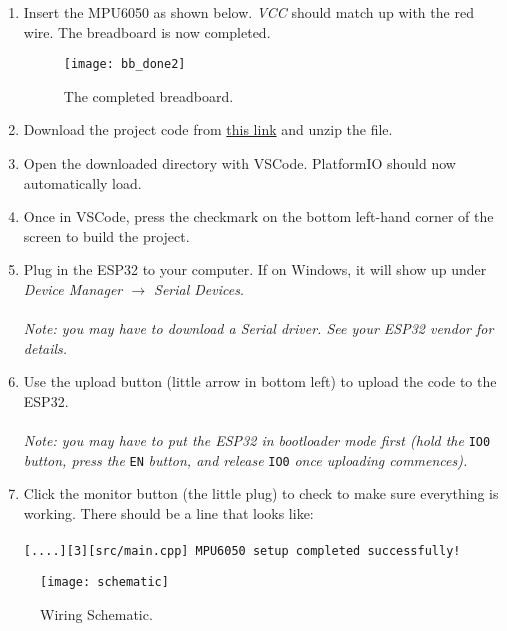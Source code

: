 \begin{enumerate}
\item Insert the MPU6050 as shown below. \textit{VCC} should match up with the
  red wire. The breadboard is now completed.
  \begin{figure}[H]
    \centering
    \texttt{[image: bb\_done2]}
    \caption[Completed breadboard]{The completed breadboard.}
  \end{figure}
  
\item Download the project code
  from
  \href{https://github.com/MrAwesomeRocks/dtc-head-tracker/archive/refs/heads/master.zip}{this
    link} and unzip the file.
  
\item Open the downloaded directory with VSCode. PlatformIO should now
  automatically load.
  
\item Once in VSCode, press the checkmark on the bottom left-hand corner of the
  screen to build the project.
  
\item Plug in the ESP32 to your computer. If on Windows, it will show up
  under \textit{Device Manager $\rightarrow$ Serial Devices}.\\
  \\
  \textit{Note: you may have to download a Serial driver. See your ESP32 vendor
    for details.}
  
\item Use the upload button (little arrow in bottom left) to upload the code to
  the ESP32.\\
  \\
  \textit{Note: you may have to put the ESP32 in bootloader mode first (hold
    the} \verb|IO0| \textit{button, press the} \verb|EN| \textit{button, and
    release} \verb|IO0| \textit{once uploading commences).}

\item Click the monitor button (the little plug) to check to make sure
  everything is working. There should be a line that looks like:\\
  \\
  \color{ForestGreen}\verb|[....][3][src/main.cpp] MPU6050 setup completed successfully!|
\end{enumerate}

\begin{figure}[h]
  \centering
  \texttt{[image: schematic]}
  \caption[Device Schematic]{Wiring Schematic.}
  \label{fig:schematic}
\end{figure}


